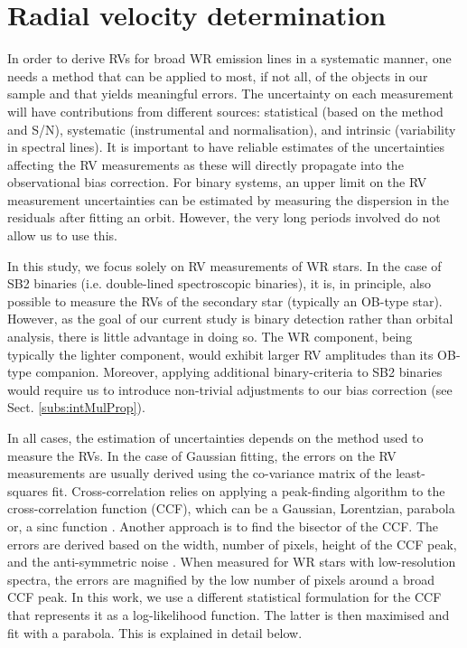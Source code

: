 \section{Radial velocity determination}
\label{sect:RVdet}

In order to derive RVs for broad WR emission lines in a systematic manner, one needs a method that can be applied to most, if not all, of the objects in our sample and that yields meaningful errors. The uncertainty on each measurement will have contributions from different sources: statistical (based on the method and S/N), systematic (instrumental and normalisation), and intrinsic (variability in spectral lines). It is important to have reliable estimates of the uncertainties affecting the RV measurements as these will directly propagate into the observational bias correction. For binary systems, an upper limit on the RV measurement uncertainties can be estimated by measuring the dispersion in the residuals after fitting an orbit. However, the very long periods involved do not allow us to use this.

In this study, we focus solely on RV measurements of WR stars. In the case of SB2 binaries (i.e. double-lined spectroscopic binaries), it is, in principle, also possible to measure the RVs of the secondary star (typically an OB-type star). However, as the goal of our current study is binary detection rather than orbital analysis, there is little advantage in doing so. The WR component, being typically the lighter component, would exhibit larger RV amplitudes than its OB-type companion. Moreover, applying additional binary-criteria to SB2 binaries would require us to introduce non-trivial adjustments to our bias correction (see Sect. \ref{subs:intMulProp}).

In all cases, the estimation of uncertainties depends on the method used to measure the RVs. In the case of Gaussian fitting, the errors on the RV measurements are usually derived using the co-variance matrix of the least-squares fit. Cross-correlation relies on applying a peak-finding algorithm to the cross-correlation function (CCF), which can be a Gaussian, Lorentzian, parabola or, a sinc function \citep[e.g.][]{tody_iraf_1993}. Another approach is to find the bisector of the CCF. The errors are derived based on the width, number of pixels, height of the CCF peak, and the anti-symmetric noise \citep{tonry_survey_1979}. When measured for WR stars with low-resolution spectra, the errors are magnified by the low number of pixels around a broad CCF peak. In this work, we use a different statistical formulation for the CCF that represents it as a log-likelihood function. The latter is then maximised and fit with a parabola. This is explained in detail below.
